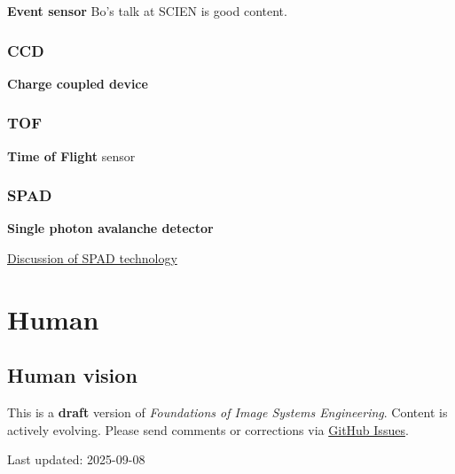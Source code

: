 \documentclass[
  letterpaper,
]{book}
\begin{document}
\textbf{Event sensor} Bo's talk at SCIEN is good content.

\section{CCD}\label{sec-sensor-ccd}

\textbf{Charge coupled device}

\section{TOF}\label{sec-sensor-tof}

\textbf{Time of Flight} sensor

\section{SPAD}\label{sec-sensor-spad}

\textbf{Single photon avalanche detector}

\href{https://g.co/gemini/share/1618a5d47f5a}{Discussion of SPAD
technology}

\part{Human}

\chapter{Human vision}\label{sec-human}

\begin{tcolorbox}[enhanced jigsaw, opacityback=0, breakable, coltitle=black, leftrule=.75mm, left=2mm, colframe=quarto-callout-warning-color-frame, opacitybacktitle=0.6, bottomtitle=1mm, bottomrule=.15mm, toprule=.15mm, title=\textcolor{quarto-callout-warning-color}{\faExclamationTriangle}\hspace{0.5em}{Work in Progress}, titlerule=0mm, toptitle=1mm, colback=white, rightrule=.15mm, colbacktitle=quarto-callout-warning-color!10!white, arc=.35mm]

This is a \textbf{draft} version of \emph{Foundations of Image Systems
Engineering}. Content is actively evolving. Please send comments or
corrections via \href{https://github.com/wandell/FISE-git/issues}{GitHub
Issues}.

Last updated: 2025-09-08

\end{tcolorbox}
\end{document}
